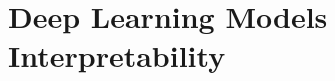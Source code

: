 \documentclass[../main.tex]{subfiles}
\begin{document}
    \section{Deep Learning Models Interpretability}
        
        
        
\end{document}
